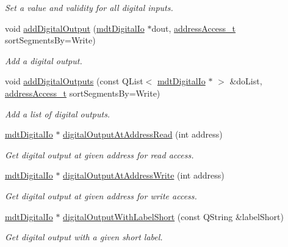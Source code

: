 \begin{DoxyCompactItemize}
\begin{DoxyCompactList}\small\item\em Set a value and validity for all digital inputs. \end{DoxyCompactList}\item 
void \hyperlink{classmdt_device_ios_afb202474ccc9b0ca58385b84283fecd4}{addDigitalOutput} (\hyperlink{classmdt_digital_io}{mdtDigitalIo} $\ast$dout, \hyperlink{classmdt_device_ios_a72fc3fdcd905d669b1e90496e808d6dd}{addressAccess\_\-t} sortSegmentsBy=Write)
\begin{DoxyCompactList}\small\item\em Add a digital output. \end{DoxyCompactList}\item 
void \hyperlink{classmdt_device_ios_adf6a8efe1f82a9cfeea12afce6d58a5d}{addDigitalOutputs} (const QList$<$ \hyperlink{classmdt_digital_io}{mdtDigitalIo} $\ast$ $>$ \&doList, \hyperlink{classmdt_device_ios_a72fc3fdcd905d669b1e90496e808d6dd}{addressAccess\_\-t} sortSegmentsBy=Write)
\begin{DoxyCompactList}\small\item\em Add a list of digital outputs. \end{DoxyCompactList}\item 
\hyperlink{classmdt_digital_io}{mdtDigitalIo} $\ast$ \hyperlink{classmdt_device_ios_a87647e98e2574a1e5f7c8780f9c33b13}{digitalOutputAtAddressRead} (int address)
\begin{DoxyCompactList}\small\item\em Get digital output at given address for read access. \end{DoxyCompactList}\item 
\hyperlink{classmdt_digital_io}{mdtDigitalIo} $\ast$ \hyperlink{classmdt_device_ios_af50bc664e381265b93b1e8faf7f883b7}{digitalOutputAtAddressWrite} (int address)
\begin{DoxyCompactList}\small\item\em Get digital output at given address for write access. \end{DoxyCompactList}\item 
\hyperlink{classmdt_digital_io}{mdtDigitalIo} $\ast$ \hyperlink{classmdt_device_ios_acecc7f9abb21613fed90212eef4d4dda}{digitalOutputWithLabelShort} (const QString \&labelShort)
\begin{DoxyCompactList}\small\item\em Get digital output with a given short label. \end{DoxyCompactList}\item 

\end{DoxyCompactItemize}
